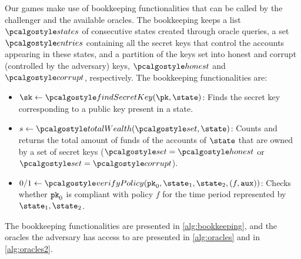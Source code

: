 Our games make use of bookkeeping functionalities that can be called by the challenger and the available oracles. The bookkeeping keeps a list $\stateslist$ of consecutive states created through oracle queries, a set $\entries$ containing all the secret keys that control the accounts appearing in these states, and a partition of the keys set into honest and corrupt (controlled by the adversary) keys, $\honest$ and $\corrupt$, respectively. 
The bookkeeping functionalities are:
\begin{itemize}
    \item $\sk \gets \findsecretkey(\pk, \state)$: Finds the secret key corresponding to a public key present in a state. 
    \item $s\gets \countwealth(\honestorcorrupt, \state)$: Counts and returns the total amount of funds of the accounts of $\state$ that are owned by a set of secret keys ($\honestorcorrupt = \honest$ or $\honestorcorrupt = \corrupt$).
    \item $0 / 1 \gets \verifypolicy(\inpk, \snap_1, \snap_2, (f, \aux))$: Checks whether $\textup{\texttt{pk}}_{0}$ is compliant with policy $f$ for the time period represented by $\snap_1, \snap_2$.
\end{itemize}


The bookkeeping functionalities are presented in \autoref{alg:bookkeeping}, and the oracles the adversary has access to are presented in \autoref{alg:oracles} and in \autoref{alg:oracles2}.


